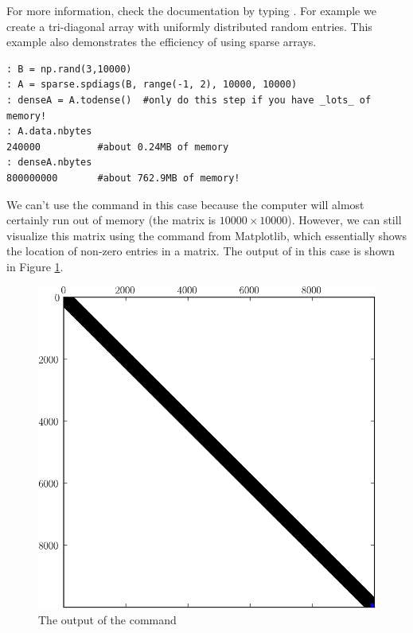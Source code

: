 For more information, check the documentation by typing . 
For example we create a tri-diagonal array with uniformly distributed random entries. 
This example also demonstrates the efficiency of using sparse arrays.
\begin{lstlisting}
: B = np.rand(3,10000)
: A = sparse.spdiags(B, range(-1, 2), 10000, 10000)
: denseA = A.todense()  #only do this step if you have _lots_ of memory!
: A.data.nbytes
240000          #about 0.24MB of memory
: denseA.nbytes
800000000       #about 762.9MB of memory!
\end{lstlisting}
We can't use the  command in this case because the computer will almost 
certainly run out of memory (the matrix is $10000 \times 10000$). 
However, we can still visualize this matrix using the  command from Matplotlib, 
which essentially shows the location of non-zero entries in a matrix. 
The output of  in this case is shown in Figure \ref{fig:mpl_spy}.
\begin{figure}[h]
\centering
\includegraphics[width=\textwidth]{spy.pdf}
\caption{The output of the  command}
\label{fig:mpl_spy}
\end{figure}

